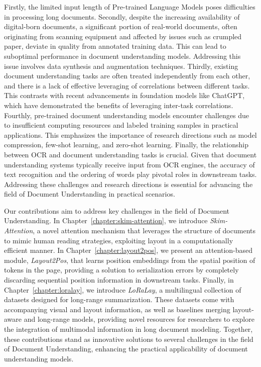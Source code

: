 Firstly, the limited input length of Pre-trained Language Models poses difficulties in processing long documents. Secondly, despite the increasing availability of digital-born documents, a significant portion of real-world documents, often originating from scanning equipment and affected by issues such as crumpled paper, deviate in quality from annotated training data. This can lead to suboptimal performance in document understanding models. Addressing this issue involves data synthesis and augmentation techniques. Thirdly, existing document understanding tasks are often treated independently from each other, and there is a lack of effective leveraging of correlations between different tasks. This contrasts with recent advancements in foundation models like ChatGPT, which have demonstrated the benefits of leveraging inter-task correlations. Fourthly, pre-trained document understanding models encounter challenges due to insufficient computing resources and labeled training samples in practical applications. This emphasizes the importance of research directions such as model compression, few-shot learning, and zero-shot learning. Finally, the relationship between \ac{OCR} and document understanding tasks is crucial. Given that document understanding systems typically receive input from \ac{OCR} engines, the accuracy of text recognition and the ordering of words play pivotal roles in downstream tasks. Addressing these challenges and research directions is essential for advancing the field of Document Understanding in practical scenarios.

Our contributions aim to address key challenges in the field of Document Understanding. In Chapter~\ref{chapter:skim-attention}, we introduce \textit{Skim-Attention}, a novel attention mechanism that leverages the structure of documents to mimic human reading strategies, exploiting layout in a computationally efficient manner. In Chapter~\ref{chapter:layout2pos}, we present an attention-based module, \textit{Layout2Pos}, that learns position embeddings from the spatial position of tokens in the page, providing a solution to serialization errors by completely discarding sequential position information in downstream tasks. Finally, in Chapter~\ref{chapter:loralay}, we introduce \textit{LoRaLay}, a multilingual collection of datasets designed for long-range summarization. These datasets come with accompanying visual and layout information, as well as baselines merging layout-aware and long-range models, providing novel resources for researchers to explore the integration of multimodal information in long document modeling. Together, these contributions stand as innovative solutions to several challenges in the field of Document Understanding, enhancing the practical applicability of document understanding models.


\acresetall
